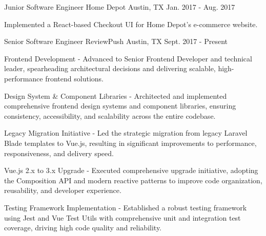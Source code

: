 \begin{cventries}
    \cventry
    {Junior Software Engineer} %
    {Home Depot} %
    {Austin, TX} %
    {Jan. 2017 - Aug. 2017} %
    {
        \vspace{-4mm}
        \begin{cvitems} %
            \item {Implemented a React-based Checkout UI for Home Depot's e-commerce website.}
        \end{cvitems}
    }
    \cventry
    {Senior Software Engineer} %
    {ReviewPush} %
    {Austin, TX} %
    {Sept. 2017 - Present} %
    {
        \vspace{-4mm}
        \begin{cvitems} %
            \item {Frontend Development - Advanced to Senior Frontend Developer and technical leader, spearheading architectural decisions and delivering scalable, high-performance frontend solutions.}
        \end{cvitems}
        \begin{cvsubitems}
            \item {Design System \& Component Libraries - Architected and implemented comprehensive frontend design systems and component libraries, ensuring consistency, accessibility, and scalability across the entire codebase.}
            \item {Legacy Migration Initiative - Led the strategic migration from legacy Laravel Blade templates to Vue.js, resulting in significant improvements to performance, responsiveness, and delivery speed.}
            \item {Vue.js 2.x to 3.x Upgrade - Executed comprehensive upgrade initiative, adopting the Composition API and modern reactive patterns to improve code organization, reusability, and developer experience.}
            \item {Testing Framework Implementation - Established a robust testing framework using Jest and Vue Test Utils with comprehensive unit and integration test coverage, driving high code quality and reliability.}

\end{cvsubitems}}
\end{cventries}
